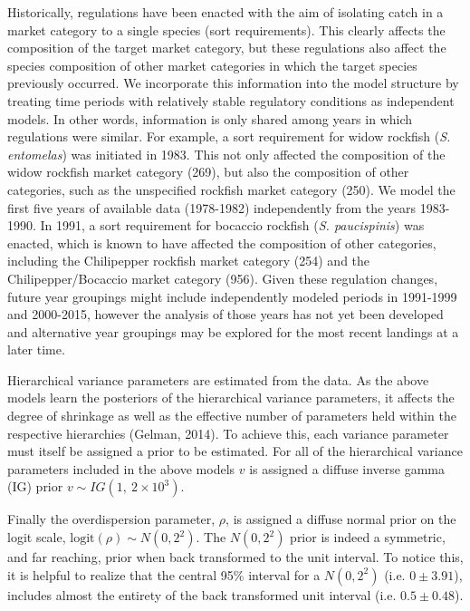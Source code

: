 \documentclass[12pt]{article}
\begin{document}
Historically, regulations have been enacted with the aim of isolating
catch in a market category to a single species (sort requirements). This
clearly affects the composition of the target market category, but these
regulations also affect the species composition of other market
categories in which the target species previously occurred. We
incorporate this information into the model structure by treating time
periods with relatively stable regulatory conditions as independent
models. In other words, information is only shared among years in which
regulations were similar. For example, a sort requirement for widow
rockfish (\textit{S. entomelas}) was initiated in 1983. This not only affected
the composition of the widow rockfish market category (269), but also
the composition of other categories, such as the unspecified rockfish
market category (250). We model the first five years of available data
(1978-1982) independently from the years 1983-1990. In 1991, a sort
requirement for bocaccio rockfish (\textit{S. paucispinis}) was enacted, which is
known to have affected the composition of other categories, including the 
Chilipepper rockfish market category (254) and the Chilipepper/Bocaccio market 
category (956). Given these regulation changes, future year groupings might 
include independently modeled periods in 1991-1999 and 2000-2015, however the 
analysis of those years has not yet been developed and alternative year 
groupings may be explored for the most recent landings at a later time.
%

Hierarchical variance parameters are estimated from the data. As the
above models learn the posteriors of the hierarchical variance
parameters, it affects the degree of shrinkage as well as the effective
number of parameters held within the respective hierarchies (Gelman,
2014). To achieve this, each variance parameter must itself be assigned
a prior to be estimated. For all of the hierarchical variance parameters
included in the above models \(v\) is assigned a diffuse inverse gamma
(IG) prior \(v \sim IG(1,~2\times10^{3})\).

Finally the overdispersion parameter, \(\rho\), is assigned a diffuse
normal prior on the logit scale, \(\text{logit}(\rho) \sim N(0, 2^2)\).
The \(N(0, 2^2)\) prior is indeed a symmetric, and far reaching, prior
when back transformed to the unit interval. To notice this, it is
helpful to realize that the central 95\% interval for a \(N(0, 2^2)\)
(i.e. \(0\pm3.91\)), includes almost the entirety of the back
transformed unit interval (i.e. \(0.5\pm0.48\)).
\end{document}
